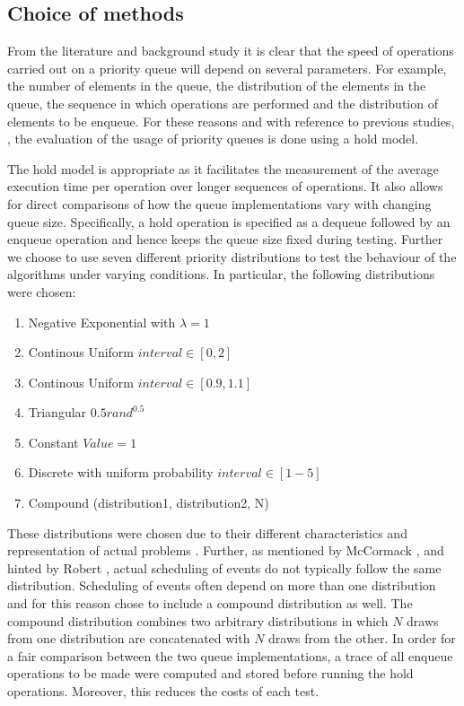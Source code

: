 \documentclass{article}
\begin{document}
\subsection{Choice of methods}
From the literature and background study it is clear that the speed of operations carried out on a priority queue will depend on several parameters. For example, the number of elements in the queue, the distribution of the elements in the queue, the sequence in which operations are performed and the distribution of elements to be enqueue. For these reasons and with reference to previous studies, \cite{Jones, McCormack, vaucher}, the evaluation of the usage of priority queues is done using a hold model.

The hold model is appropriate as it facilitates the measurement of the average execution time per operation over longer sequences of operations. It also allows for direct comparisons of how the queue implementations vary with changing queue size. Specifically, a hold operation is specified as a dequeue followed by an enqueue operation and hence keeps the queue size fixed during testing. Further we choose to use seven different priority distributions to test the behaviour of the algorithms under varying conditions. In particular, the following distributions were chosen:

\begin{enumerate}
    \item Negative Exponential with \(\lambda = 1\)
    \item Continous Uniform \(interval \in [0, 2]\)
    \item Continous Uniform \(interval \in [0.9, 1.1]\)
    \item Triangular \(0.5rand^{0.5}\)
    \item Constant \(Value = 1\)
    \item Discrete with uniform probability \(interval \in [1-5]\)
    \item Compound (distribution1, distribution2, N)
\end{enumerate}

These distributions were chosen due to their different characteristics and representation of actual problems \cite{vaucher}. Further, as mentioned by McCormack \cite{McCormack}, and hinted by Robert \cite{Ronngren}, actual scheduling of events do not typically follow the same distribution. Scheduling of events often depend on more than one distribution and for this reason chose to include a compound distribution as well. The compound distribution combines two arbitrary distributions in which \(N\) draws from one distribution are concatenated with \(N\) draws from the other. In order for a fair comparison between the two queue implementations, a trace of all enqueue operations to be made were computed and stored before running the hold operations. Moreover, this reduces the costs of each test.
\end{document}
